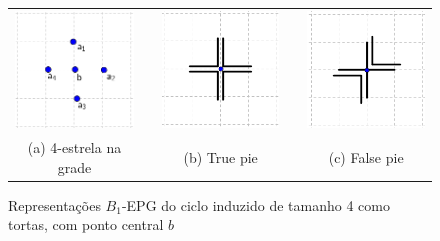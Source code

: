 \begin{figure}[htb]
  \centering
  \begin{tabular}{c c c c c }
    \includegraphics[width=3.5cm]{./img/disposicaoTortaGrid.png}    
    & &\includegraphics[width=3.5cm]{./img/truePieGrid.png} 
    & &
 \includegraphics[width=3.5cm]{./img/falsePieGrid.png} \\%
    {\footnotesize (a) 4-estrela na grade}  & &  {\footnotesize (b) True pie} & & {\footnotesize (c) False pie} %
  \end{tabular}
  \caption{Representações $B_{1}$-EPG do ciclo induzido de tamanho  4 como tortas, com ponto central $b$}\label{fig:piesInGrid}
\end{figure} 